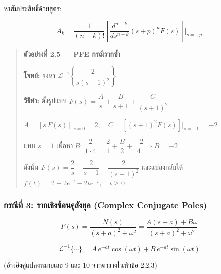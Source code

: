หาสัมประสิทธิ์ด้วยสูตร:

\[A_k = \frac{1}{(n-k)!}\left[\frac{d^{n-k}}{ds^{n-k}}(s+p)^n F(s)\right]\Bigg|_{s=-p}\]

\begin{quote}
\textbf{ตัวอย่างที่ 2.5 --- PFE กรณีรากซ้ำ}

\textbf{โจทย์:} จงหา
\(\mathcal{L}^{-1}\!\left\{\dfrac{2}{s(s+1)^2}\right\}\)

\textbf{วิธีทำ:} ตั้งรูปแบบ
\(F(s) = \dfrac{A}{s} + \dfrac{B}{s+1} + \dfrac{C}{(s+1)^2}\)

\(A = [s\,F(s)]\big|_{s=0} = 2\), ~
\(C = [(s+1)^2 F(s)]\big|_{s=-1} = -2\)

แทน \(s=1\) เพื่อหา \(B\):
\(\dfrac{2}{1\cdot 4} = \dfrac{2}{1} + \dfrac{B}{2} + \dfrac{-2}{4} \Rightarrow B = -2\)

ดังนั้น \(F(s) = \dfrac{2}{s} - \dfrac{2}{s+1} - \dfrac{2}{(s+1)^2}\)
และแปลงกลับได้ \(\boxed{f(t) = 2 - 2e^{-t} - 2te^{-t},\quad t \geq 0}\)
\end{quote}

\subsubsection{กรณีที่ 3: รากเชิงซ้อนคู่สังยุค (Complex Conjugate
Poles)}\label{uxe01uxe23uxe13uxe17-3-uxe23uxe32uxe01uxe40uxe0auxe07uxe0buxe2duxe19uxe04uxe2auxe07uxe22uxe04-complex-conjugate-poles}

\[F(s) = \frac{N(s)}{(s+a)^2 + \omega^2} = \frac{A(s+a) + B\omega}{(s+a)^2 + \omega^2}\]

\[\mathcal{L}^{-1}\{\cdots\} = A\,e^{-at}\cos(\omega t) + B\,e^{-at}\sin(\omega t)\]

(อ้างอิงคู่แปลงหมายเลข 9 และ 10 จากตารางในหัวข้อ 2.2.3)

